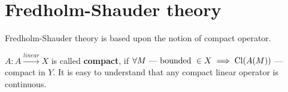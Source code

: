 \section{Fredholm-Shauder theory}
Fredholm-Shauder theory is based upon the notion of compact operator.
\begin{defn}
  $A \colon A \xrightarrow{linear} X$ is called \textbf{compact}, if $\forall M 
  \text{ --- bounded } \in X \implies \operatorname{Cl}({A(M)})$ --- compact in $Y$. It is easy to understand that any
  compact linear operator is continuous.
\end{defn}